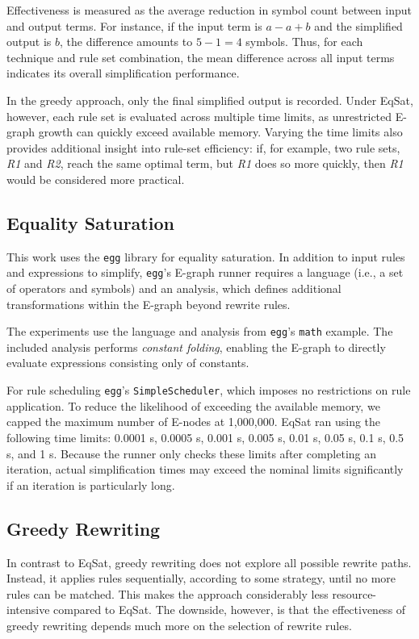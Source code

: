 Effectiveness is measured as the average reduction in symbol count between input and output terms. For instance, if the input term is $a - a + b$ and the simplified output is $b$, the difference amounts to $5 - 1 = 4$ symbols. Thus, for each technique and rule set combination, the mean difference across all input terms indicates its overall simplification performance.

In the greedy approach, only the final simplified output is recorded. Under EqSat, however, each rule set is evaluated across multiple time limits, as unrestricted E-graph growth can quickly exceed available memory. Varying the time limits also provides additional insight into rule-set efficiency: if, for example, two rule sets, \emph{R1} and \emph{R2}, reach the same optimal term, but \emph{R1} does so more quickly, then \emph{R1} would be considered more practical.

\subsection{Equality Saturation}
\label{sec:eqsat}
This work uses the \texttt{egg} library for equality saturation. In addition to input rules and expressions to simplify, \texttt{egg}'s E-graph runner requires a language (i.e., a set of operators and symbols) and an analysis, which defines additional transformations within the E-graph beyond rewrite rules.

The experiments use the language and analysis from \texttt{egg}'s \texttt{math} example. The included analysis performs \emph{constant folding}, enabling the E-graph to directly evaluate expressions consisting only of constants. 

For rule scheduling \texttt{egg}'s \texttt{SimpleScheduler}, which imposes no restrictions on rule application. To reduce the likelihood of exceeding the available memory, we capped the maximum number of E-nodes at 1,000,000. EqSat ran using the following time limits: 0.0001 s, 0.0005 s, 0.001 s, 0.005 s, 0.01 s, 0.05 s, 0.1 s, 0.5 s, and 1 s. Because the runner only checks these limits after completing an iteration, actual simplification times may exceed the nominal limits significantly if an iteration is particularly long.

\subsection{Greedy Rewriting}
\label{sec:greedy}
In contrast to EqSat, greedy rewriting does not explore all possible rewrite paths. Instead, it applies rules sequentially, according to some strategy, until no more rules can be matched. This makes the approach considerably less resource-intensive compared to EqSat. The downside, however, is that the effectiveness of greedy rewriting depends much more on the selection of rewrite rules. 

